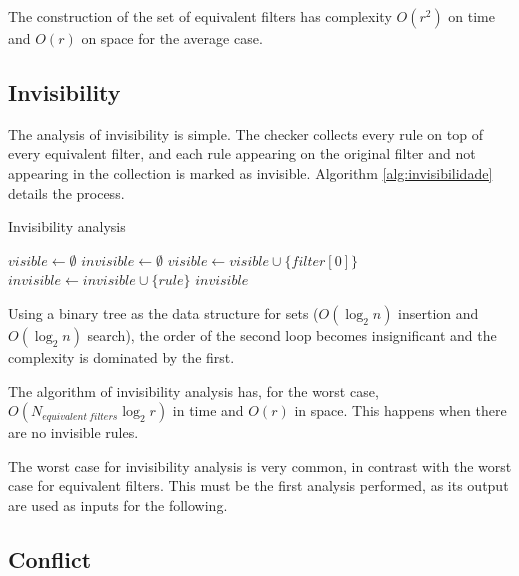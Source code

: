 \begin{mathstatement}
	The construction of the set of equivalent filters has complexity $O(r^2)$ on
	time and $O(r)$ on space for the average case.
\end{mathstatement}



\subsection{Invisibility}


The analysis of invisibility is simple. The checker collects every rule on top
of every equivalent filter, and each rule appearing on the original filter and
not appearing in the collection is marked as invisible. Algorithm
\ref{alg:invisibilidade} details the process.

\begin{algorithm}
	\caption{\label{alg:invisibilidade}Invisibility analysis}
	\begin{algorithmic}[1]
			\State $visible \gets \emptyset$
			\State $invisible \gets \emptyset$
				\State $visible \gets visible \cup \{filter[0]\}$
			\EndFor
					\State $invisible \gets invisible \cup \{rule\}$
				\EndIf
			\EndFor
			\State \Return $invisible$
		\EndFunction
	\end{algorithmic}
\end{algorithm}

Using a binary tree as the data structure for sets
($O(\log_2{n})$ insertion and $O(\log_2{n})$ search), the order of the second
loop becomes insignificant and the complexity is dominated by the first.

\begin{mathstatement}
	The algorithm of invisibility analysis has, for the worst case,
	$O(N_{equivalent\ filters} \log_2{r})$ in time and $O(r)$ in space. This
	happens when there are no invisible rules.
\end{mathstatement}

The worst case for invisibility analysis is very common, in contrast with the
worst case for equivalent filters.
This must be the first analysis performed, as its output are used as inputs for
the following.


\subsection{Conflict}

